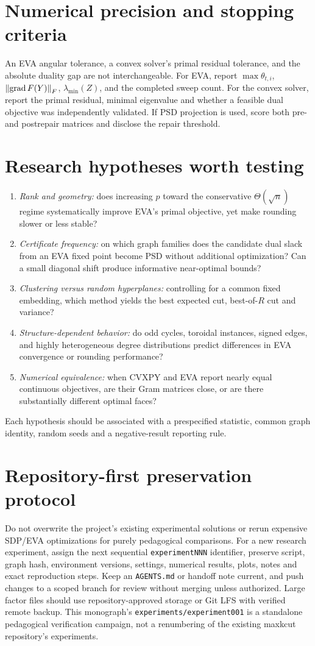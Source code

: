 \section{Numerical precision and stopping criteria}
An EVA angular tolerance, a convex solver's primal residual tolerance, and the absolute duality gap are not interchangeable. For EVA, report $\max\theta_{t,i}$, $\left\lVert \operatorname{grad}F(Y)\right\rVert_F$, $\lambda_{\min}(Z)$, and the completed sweep count. For the convex solver, report the primal residual, minimal eigenvalue and whether a feasible dual objective was independently validated. If PSD projection is used, score both pre- and postrepair matrices and disclose the repair threshold.

\section{Research hypotheses worth testing}
\begin{enumerate}
\item \emph{Rank and geometry:} does increasing $p$ toward the conservative $\Theta(\sqrt n)$ regime systematically improve EVA's primal objective, yet make rounding slower or less stable?
\item \emph{Certificate frequency:} on which graph families does the candidate dual slack from an EVA fixed point become PSD without additional optimization? Can a small diagonal shift produce informative near-optimal bounds?
\item \emph{Clustering versus random hyperplanes:} controlling for a common fixed embedding, which method yields the best expected cut, best-of-$R$ cut and variance?
\item \emph{Structure-dependent behavior:} do odd cycles, toroidal instances, signed edges, and highly heterogeneous degree distributions predict differences in EVA convergence or rounding performance?
\item \emph{Numerical equivalence:} when CVXPY and EVA report nearly equal continuous objectives, are their Gram matrices close, or are there substantially different optimal faces?
\end{enumerate}
Each hypothesis should be associated with a prespecified statistic, common graph identity, random seeds and a negative-result reporting rule.

\section{Repository-first preservation protocol}
Do not overwrite the project's existing experimental solutions or rerun expensive SDP/EVA optimizations for purely pedagogical comparisons. For a new research experiment, assign the next sequential \texttt{experimentNNN} identifier, preserve script, graph hash, environment versions, settings, numerical results, plots, notes and exact reproduction steps. Keep an \texttt{AGENTS.md} or handoff note current, and push changes to a scoped branch for review without merging unless authorized. Large factor files should use repository-approved storage or Git LFS with verified remote backup. This monograph's \texttt{experiments/experiment001} is a standalone pedagogical verification campaign, not a renumbering of the existing maxkcut repository's experiments.
